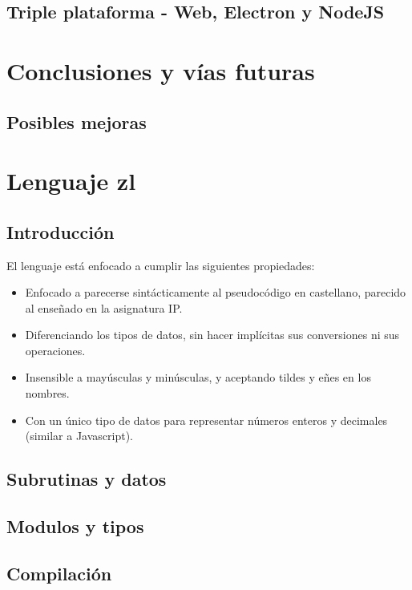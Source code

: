 \documentclass{report}
\begin{document}
	\section{Triple plataforma - Web, Electron y NodeJS}
	
	\chapter{Conclusiones y vías futuras}
	
	\section{Posibles mejoras}
	
	
	
	
\iffalse
	
	\chapter{Lenguaje zl}
	\section{Introducción}
	El lenguaje está enfocado a cumplir las siguientes propiedades:
	
	\begin{itemize}
		\item Enfocado a parecerse sintácticamente al pseudocódigo en castellano, parecido al enseñado en la asignatura IP.
		\item Diferenciando los tipos de datos, sin hacer implícitas sus conversiones ni sus operaciones.
		\item Insensible a mayúsculas y minúsculas, 
		y aceptando tildes y eñes en los nombres.
		\item Con un único tipo de datos para representar números enteros y decimales (similar a Javascript).
	\end{itemize}

	\section{Subrutinas y datos}
	
	\section{Modulos y tipos}
	
	\section{Compilación}
	
\end{document}
